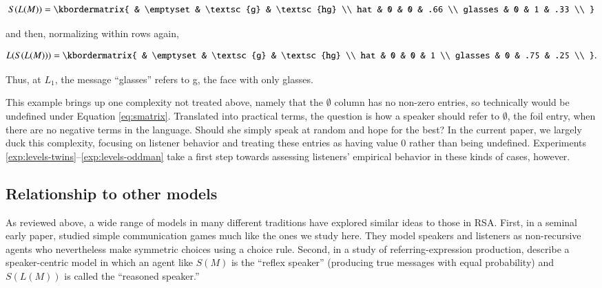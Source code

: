 \documentclass[man,noapacite]{apa2}
\newcounter{Experiment}
\newcommand{\exptrefrange}[2]{Experiments\,\ref{#1}--\ref{#2}}
\begin{document}
\begin{equation}
    S(L(M)) = \kbordermatrix{
      & \emptyset & \textsc{g} & \textsc{hg} \\
      hat & 0 & 0 & .66  \\
      glasses & 0 & 1 & .33 \\
    }
\end{equation}

\noindent and then, normalizing within rows again,

\begin{equation}
L(S(L(M))) = \kbordermatrix{
  & \emptyset & \textsc{g} & \textsc{hg} \\
  hat & 0 & 0 & 1 \\
  glasses & 0 & .75 & .25 \\
}.
\end{equation}

\noindent Thus, at $L_1$, the message ``glasses'' refers to {\sc g}, the face with only glasses.

This example brings up one complexity not treated above, namely that the $\emptyset$ column has no non-zero entries, so technically would be undefined under Equation \ref{eq:smatrix}. Translated into practical terms, the question is how a speaker should refer to $\emptyset$, the foil entry, when there are no negative terms in the language. Should she simply speak at random and hope for the best? In the current paper, we largely duck this complexity, focusing on listener behavior and treating these entries as having value 0 rather than being undefined. \exptrefrange{exp:levels-twins}{exp:levels-oddman} take a first step towards assessing listeners' empirical behavior in these kinds of cases, however.

\subsection{Relationship to other models}

As reviewed above, a wide range of models in many different traditions have explored similar ideas to those in RSA.
First, in a seminal early paper,  studied simple communication games much like the ones we study here. They model speakers and listeners as non-recursive agents who nevertheless make symmetric choices using a  choice rule. Second, in a study of referring-expression production,  describe a speaker-centric model in which an agent like $S(M)$ is the ``reflex speaker'' (producing true messages with equal probability) and $S(L(M))$ is called the ``reasoned speaker.''
\end{document}
